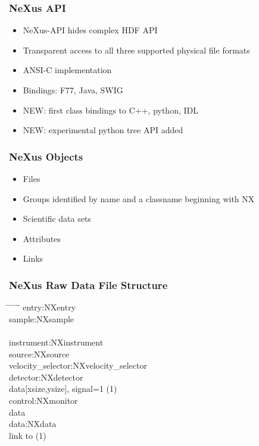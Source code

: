 \documentclass{beamer}
\begin{document}
\begin{frame} \frametitle{NeXus API }
\begin{itemize}
\item NeXus-API hides complex HDF API
\item Transparent access to all three supported physical file formats
\item ANSI-C implementation
\item Bindings: F77, Java, SWIG
\item {\color{red}NEW}: first class bindings to C++, python, IDL
\item {\color{red}NEW}: experimental python tree API added 
\end{itemize}
\end{frame}


\begin{frame} \frametitle{NeXus Objects}
\begin{itemize}
\item Files
\item Groups identified by name and a classname beginning with NX
\item Scientific data sets
\item Attributes
\item Links
\end{itemize}
\end{frame}


\begin{frame} \frametitle{NeXus Raw Data File Structure}
\begin{tabbing}
\hspace*{1cm} \= \hspace*{1cm} \= \hspace*{1cm} \= \hspace*{1cm} \= \hspace*{1cm} \= \hspace*{1cm}\= \kill
entry:NXentry \\
 \>sample:NXsample \\
\\
 \>instrument:NXinstrument\\
 \> \> source:NXsource\\
 \> \> velocity\_selector:NXvelocity\_selector\\
 \> \> detector:NXdetector \\
 \> \> \>data[xsize,ysize], signal=1 (1)\\
 \>control:NXmonitor\\
 \> \>data\\
 \>data:NXdata\\
 \> \> link to (1)\\
\end{tabbing}
\end{frame}
\end{document}
